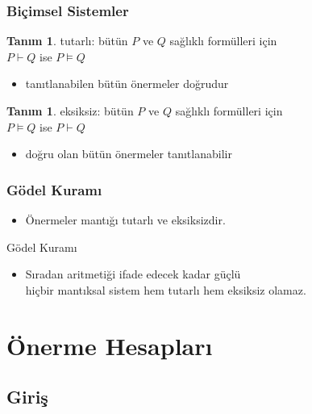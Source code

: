 \documentclass[dvipsnames]{beamer}
\theoremstyle{definition}
\newtheorem{tanim}[theorem]{Tanım}
\theoremstyle{example}
\theoremstyle{plain}
\begin{document}
\begin{frame}
  \frametitle{Biçimsel Sistemler}

  \begin{tanim}
    \alert{tutarlı}: bütün $P$ ve $Q$ sağlıklı formülleri için\\
      $P \vdash Q$ ise $P \vDash Q$
    \begin{itemize}
      \item tanıtlanabilen bütün önermeler doğrudur
    \end{itemize}
  \end{tanim}

  \pause
  \begin{tanim}
    \alert{eksiksiz}: bütün $P$ ve $Q$ sağlıklı formülleri için\\
      $P \vDash Q$ ise $P \vdash Q$
    \begin{itemize}
      \item doğru olan bütün önermeler tanıtlanabilir
    \end{itemize}
  \end{tanim}
\end{frame}

\begin{frame}
  \frametitle{Gödel Kuramı}

  \begin{itemize}
    \item Önermeler mantığı tutarlı ve eksiksizdir.
  \end{itemize}

  \pause
  \begin{block}{Gödel Kuramı}
    \begin{itemize}
      \item Sıradan aritmetiği ifade edecek kadar güçlü\\
        hiçbir mantıksal sistem hem tutarlı hem eksiksiz olamaz.
    \end{itemize}
  \end{block}
\end{frame}

\section{Önerme Hesapları}

\subsection{Giriş}
\end{document}

